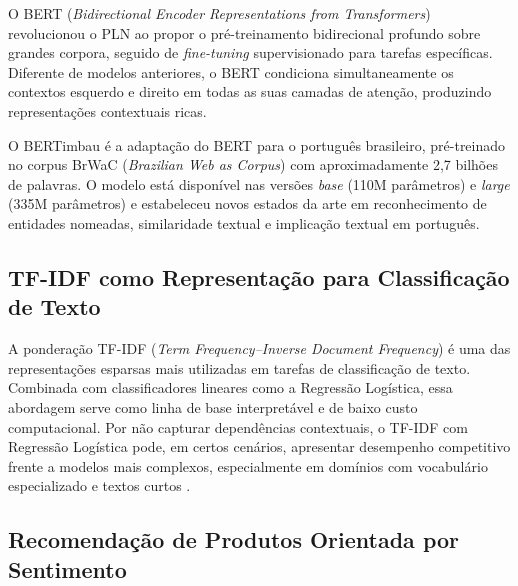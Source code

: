\documentclass{IEEEtran}
\begin{document}
O BERT (\textit{Bidirectional Encoder Representations from Transformers}) \cite{devlin2019bert} revolucionou o PLN ao propor o pré-treinamento bidirecional profundo sobre grandes corpora, seguido de \textit{fine-tuning} supervisionado para tarefas específicas. Diferente de modelos anteriores, o BERT condiciona simultaneamente os contextos esquerdo e direito em todas as suas camadas de atenção, produzindo representações contextuais ricas.

O BERTimbau \cite{souza2020bertimbau} é a adaptação do BERT para o português brasileiro, pré-treinado no corpus BrWaC (\textit{Brazilian Web as Corpus}) com aproximadamente 2,7 bilhões de palavras. O modelo está disponível nas versões \textit{base} (110M parâmetros) e \textit{large} (335M parâmetros) e estabeleceu novos estados da arte em reconhecimento de entidades nomeadas, similaridade textual e implicação textual em português.

\subsection{TF-IDF como Representação para Classificação de Texto}

A ponderação TF-IDF (\textit{Term Frequency--Inverse Document Frequency}) \cite{manning2008introduction} é uma das representações esparsas mais utilizadas em tarefas de classificação de texto. Combinada com classificadores lineares como a Regressão Logística, essa abordagem serve como linha de base interpretável e de baixo custo computacional. Por não capturar dependências contextuais, o TF-IDF com Regressão Logística pode, em certos cenários, apresentar desempenho competitivo frente a modelos mais complexos, especialmente em domínios com vocabulário especializado e textos curtos \cite{souza2022bert}.

\subsection{Recomendação de Produtos Orientada por Sentimento}
\end{document}
